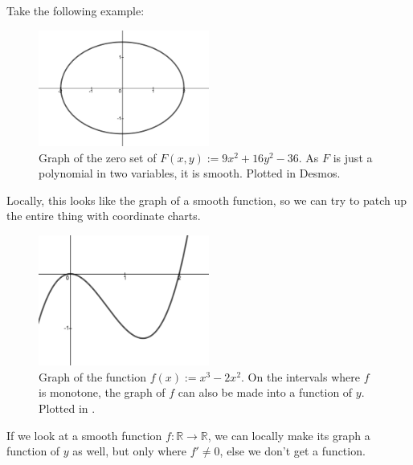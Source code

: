\documentclass[12pt]{article}
\newcommand{\real}{\mathbb{R}}
\theoremstyle{definition}
\theoremstyle{remark}
\begin{document}
Take the following example:
\begin{figure}[H]
    \centering
    \includegraphics[width=0.5\textwidth]{4.png}
    \caption{Graph of the zero set of $F(x,y):=9x^2+16y^2-36$. As $F$ is just a polynomial in two variables, it is smooth. Plotted in Desmos.}
    \label{fig:Fig4}
\end{figure}
Locally, this looks like the graph of a smooth function, so we can try to patch up the entire thing with coordinate charts.
\begin{figure}[H]
    \centering
    \includegraphics[width=0.5\textwidth]{5.png}
    \caption{Graph of the function $f(x):=x^3-2x^2$. On the intervals where $f$ is monotone, the graph of $f$ can also be made into a function of $y$. Plotted in \cite{Desmos}.}
    \label{fig:Fig5}
\end{figure}
If we look at a smooth function $f:\real\to\real$, we can locally make its graph a function of $y$ as well, but only where $f'\neq0$, else we don't get a function.
\end{document}
